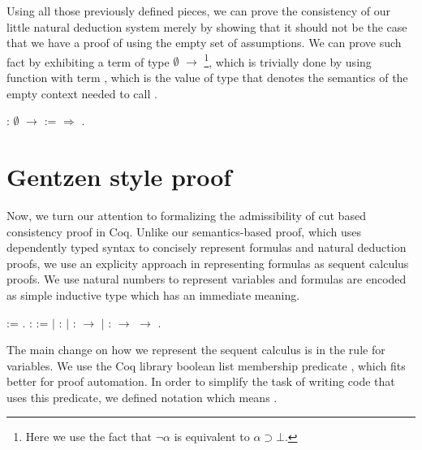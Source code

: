 Using all those previously defined pieces, we can prove the consistency of our little natural
deduction system merely by showing that it should not be the case that we have a proof of 
using the empty set of assumptions. We can prove such fact by exhibiting a term of type
 $\emptyset$  \ensuremath{\rightarrow} \footnote{Here we use the fact that $\neg \alpha$ is
equivalent to $\alpha \supset \bot$.}, which is trivially done by using function  with term
, which is the value of type  that denotes the semantics of the empty context needed to call
.
 \begin{coqdoccode}
\coqdocemptyline
\coqdocnoindent
{}  :  $\emptyset$  \ensuremath{\rightarrow} \coqdoceol
\coqdocindent{1.00em}
:=   \ensuremath{\Rightarrow}   .\coqdoceol
\coqdocemptyline
\end{coqdoccode}
\section{Gentzen style proof}\label{sec:admissibility}


Now, we turn our attention to formalizing the admissibility of cut based consistency proof in Coq.
Unlike our semantics-based proof, which uses dependently typed syntax to concisely represent formulas and
natural deduction proofs, we use an explicity approach in representing formulas as sequent calculus proofs.
We use natural numbers to represent variables and formulas are encoded as simple inductive type which has
an immediate meaning.
 \begin{coqdoccode}
\coqdocemptyline
\coqdocnoindent
{}  := .\coqdoceol
\coqdocemptyline
\coqdocnoindent
{} \coqdocvar{$\alpha$} :  :=\coqdoceol
\coqdocnoindent
\ensuremath{|}   : \coqdocvar{$\alpha$} \coqdoceol
\coqdocnoindent
\ensuremath{|}      :  \ensuremath{\rightarrow} \coqdocvar{$\alpha$}\coqdoceol
\coqdocnoindent
\ensuremath{|}  : \coqdocvar{$\alpha$} \ensuremath{\rightarrow} \coqdocvar{$\alpha$} \ensuremath{\rightarrow} \coqdocvar{$\alpha$}.\coqdoceol
\coqdocemptyline
\end{coqdoccode}
The main change on how we represent the sequent calculus is in the
rule for variables. We use the Coq library boolean list membership predicate
, which fits better for proof automation. In order to
simplify the task of writing code that uses this predicate, we defined
notation  \coqdocvar{$\in$}  which means   . 


